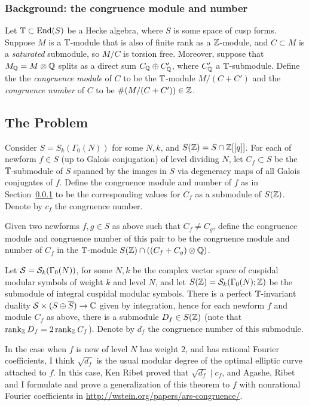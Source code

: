\documentclass{article}
\begin{document}
\subsubsection{Background: the congruence module and number}\label{sec:cong}
Let $\mathbb{T} \subset \operatorname{End}(S)$ be a Hecke algebra, where $S$ is some space
of cusp forms.  Suppose $M$ is a $\mathbb{T}$-module that is also of finite
rank as a $\mathbb{Z}$-module, and $C\subset M$ is a {\em saturated}
submodule, so $M/C$ is torsion free.  Moreover, suppose that $M_{\mathbb{Q}} =
M\otimes\mathbb{Q}$ splits as a direct sum $C_{\mathbb{Q}} \oplus C'_{\mathbb{Q}}$, where
$C'_{\mathbb{Q}}$ a $\mathbb{T}$-submodule.  Define the the {\em congruence module} of
$C$ to be the $\mathbb{T}$-module $M/(C+C')$ and the {\em congruence number}
of $C$ to be $\#(M/(C +C')) \in \mathbb{Z}$.  

\subsection{The Problem}

Consider $S=S_k(\Gamma_0(N))$ for some $N,k$, and $S(\mathbb{Z})=S\cap
\mathbb{Z}[[q]]$.  For each of newform $f\in S$ (up to Galois conjugation) of
level dividing $N$, let $C_f \subset S$ be the $\mathbb{T}$-submodule of $S$
spanned by the images in $S$ via degeneracy maps of all Galois
conjugates of $f$.  Define the congruence module and number of $f$ as
in Section~\ref{sec:cong} to be the corresponding values for $C_f$ as
a submodule of $S(\mathbb{Z})$.  Denote by $c_f$ the congruence number.

Given two newforms $f,g \in S$ as above such that $C_f \neq C_g$, define
the congruence module and congruence number of this pair to be
the congruence module and number of $C_f$ in the $\mathbb{T}$-module
$S(\mathbb{Z})\cap((C_f + C_g)\otimes\mathbb{Q})$.

Let $\mathcal{S} = \mathcal{S}_k(\Gamma_0(N))$, for some $N,k$ be the complex vector
space of cuspidal modular symbols of weight $k$ and level $N$, and let
$S(\mathbb{Z}) = \mathcal{S}_k(\Gamma_0(N);\mathbb{Z})$ be the submodule of integral cuspidal
modular symbols.  There is a perfect $\mathbb{T}$-invariant duality $\mathcal{S}
\times (S \oplus \overline{S}) \to \mathbb{C}$ given by integration, hence for
each newform $f$ and module $C_f$ as above, there is a submodule $D_f
\in S(\mathbb{Z})$ (note that $\operatorname{rank}_{\mathbb{Z}} D_f = 2\operatorname{rank}_{\mathbb{Z}} C_f$).  Denote by
$d_f$ the congruence number of this submodule.

In the case when $f$ is new of level $N$ has weight $2$, and has
rational Fourier coefficients, I think $\sqrt{d_f}$ is the usual
modular degree of the optimal elliptic curve attached to $f$.
In this case, Ken Ribet proved that $\sqrt{d_f} \mid c_f$, 
and Agashe, Ribet and I formulate and prove a generalization
of this theorem to $f$ with nonrational Fourier coefficients in
\url{http://wstein.org/papers/ars-congruence/}.
\end{document}
